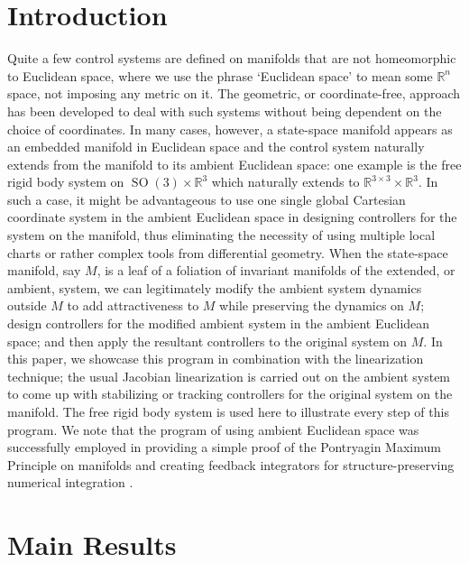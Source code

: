 \documentclass[letterpaper, 10 pt, conference]{ieeeconf}  %
\newcommand{\SO}{\operatorname{SO}(3)}
\begin{document}
\section{Introduction}
Quite a few control systems are defined on manifolds that are not homeomorphic to Euclidean space, where we  use the phrase `Euclidean space' to mean some $\mathbb R^n$ space, not imposing any metric on it. The geometric, or coordinate-free, approach has been developed to deal with such systems without being dependent on the choice of coordinates. In many  cases, however, a state-space manifold appears as an embedded manifold in Euclidean space and the control system naturally extends from the manifold to its ambient Euclidean space: one example is the free rigid body system on $\SO \times \mathbb R^3$ which  naturally extends to  $\mathbb R^{3\times 3} \times \mathbb R^3$.  In such a case, it might be advantageous to use one single global Cartesian coordinate system in the ambient Euclidean space in designing controllers for the system on the manifold, thus eliminating the necessity of using multiple local charts  or rather complex tools from differential geometry. 
When the state-space manifold, say $M$,  is a leaf of a foliation of invariant manifolds of the extended, or ambient, system, we can legitimately modify the ambient system dynamics outside $M$ to add attractiveness to $M$ while preserving the dynamics on $M$;  design controllers for the modified ambient system in the ambient Euclidean space; and then apply  the resultant controllers to the original system on $M$. In this paper, we showcase this program in combination with the linearization technique; the usual Jacobian linearization is carried out on  the ambient system  to come up with  stabilizing or tracking controllers for the original system on the manifold. The free rigid body system is used here to illustrate every step of this program. We note that  the program of  using ambient Euclidean space was successfully employed in providing a simple proof of  the Pontryagin Maximum Principle on manifolds \cite{Ch11} and creating feedback integrators for structure-preserving numerical integration \cite{ChJiPe16}. 

\section{Main Results}
\end{document}

